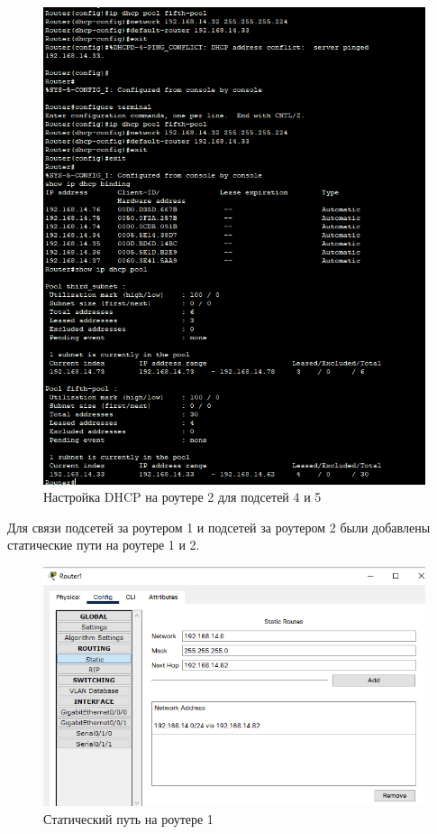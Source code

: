 \documentclass[12pt, a4paper]{extarticle}
\begin{document}
\begin{figure}[H]
	\centering
	\includegraphics[scale=0.9]{images/dhcp-set.png}
	\caption{Настройка DHCP на роутере 2 для подсетей 4 и 5}
\end{figure}

Для связи подсетей за роутером 1 и подсетей за роутером 2 были добавлены статические пути на роутере 1 и 2.
\begin{figure}[H]
	\centering
	\includegraphics[scale=0.9]{images/static.png}
	\caption{Статический путь на роутере 1}
\end{figure}
\end{document}

